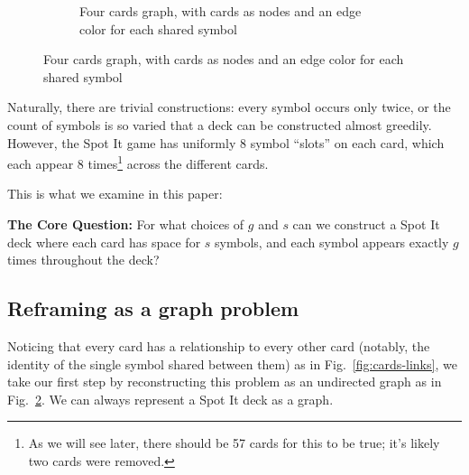 \documentclass[11pt, oneside]{article} 	%
\begin{document}
\begin{figure}[!htb]
\begin{subfigure}{.2\textwidth}
\caption{Four cards graph, with cards as nodes and an edge color for each shared symbol}
\label{fig:cards-graph}
\end{subfigure}

\end{figure}

Naturally, there are trivial constructions: every symbol occurs only twice, or the count of symbols is so varied that a deck can be constructed almost greedily. However, the Spot It game has uniformly 8 symbol ``slots'' on each card, which each appear 8 times\footnote{As we will see later, there should be 57 cards for this to be true; it's likely two cards were removed.} across the different cards. 

This is what we examine in this paper:

\begin{framed}
\textbf{The Core Question:} For what choices of $g$ and $s$ can we construct a Spot It deck where each card has space for $s$ symbols, and each symbol appears exactly $g$ times throughout the deck?
\end{framed}

\subsection{Reframing as a graph problem}
Noticing that every card has a relationship to every other card (notably, the identity of the single symbol shared between them) as in Fig.~\ref{fig:cards-links}, we take our first step by reconstructing this problem as an undirected graph as in Fig.~\ref{fig:cards-graph}. We can always represent a Spot It deck as a graph.
\end{document}
